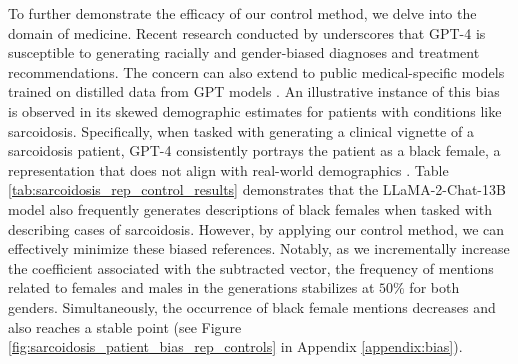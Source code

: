 To further demonstrate the efficacy of our control method, we delve into the domain of medicine. Recent research conducted by \cite{Zack2023.07.13.23292577} underscores that GPT-4 is susceptible to generating racially and gender-biased diagnoses and treatment recommendations. The concern can also extend to public medical-specific models trained on distilled data from GPT models \citep{li2023llava, han2023medalpaca}. An illustrative instance of this bias is observed in its skewed demographic estimates for patients with conditions like sarcoidosis. Specifically, when tasked with generating a clinical vignette of a sarcoidosis patient, GPT-4 consistently portrays the patient as a black female, a representation that does not align with real-world demographics \citep{brito2019geoepidemiological}. Table \ref{tab:sarcoidosis_rep_control_results} demonstrates that the LLaMA-2-Chat-13B model also frequently generates descriptions of black females when tasked with describing cases of sarcoidosis. However, by applying our control method, we can effectively minimize these biased references. Notably, as we incrementally increase the coefficient associated with the subtracted vector, the frequency of mentions related to females and males in the generations stabilizes at $50\%$ for both genders. Simultaneously, the occurrence of black female mentions decreases and also reaches a stable point (see Figure \ref{fig:sarcoidosis_patient_bias_rep_controls} in Appendix \ref{appendix:bias}).

